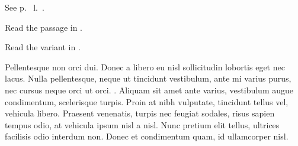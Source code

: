 \documentclass{article}
\begin{document}
See p.~ l.~.

Read the passage in .

Read the variant in .

\beginnumbering

\pstart
{}Pellentesque non orci dui. Donec a libero eu nisl sollicitudin lobortis eget nec lacus. Nulla pellentesque, neque ut tincidunt vestibulum, ante mi varius purus, nec cursus neque orci ut orci. . Aliquam sit amet ante varius, vestibulum augue condimentum, scelerisque turpis. Proin at nibh vulputate, tincidunt tellus vel, vehicula libero. Praesent venenatis, turpis nec feugiat sodales, risus sapien tempus odio, at vehicula ipsum nisl a nisl. Nunc pretium elit tellus, ultrices facilisis odio interdum non. Donec et condimentum quam, id ullamcorper nisl.
\pend

\endnumbering
\end{document}
